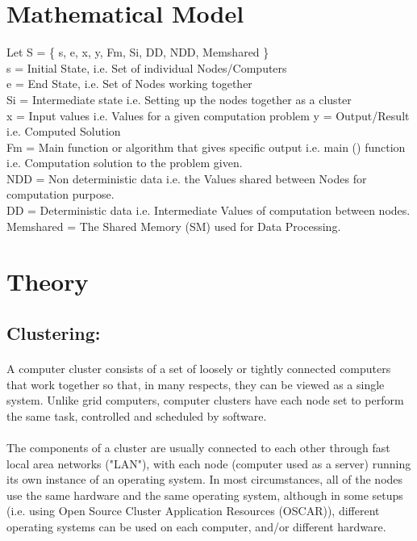 \documentclass[a4paper,12pt]{article}
\begin{document}
\section{Mathematical Model}
	Let S = \{ s, e, x, y, Fm, Si, DD, NDD, Memshared \} \\
	s = Initial State, i.e. Set of individual Nodes/Computers \\  
	e = End State, i.e. Set of Nodes working together \\	 
	Si = Intermediate state i.e. Setting up the nodes together as a cluster  \\
	x = Input values i.e. Values for a given computation problem y = Output/Result i.e. Computed Solution \\	 
	Fm = Main function or algorithm that gives specific output i.e. main () function i.e.  	Computation solution to the problem given. \\
	NDD = Non deterministic data i.e. the Values shared between Nodes for computation  	purpose. \\
	DD = Deterministic data i.e. Intermediate Values of computation between nodes.\\
	 Memshared = The Shared Memory (SM) used for Data Processing. \\
	
	
	
\section{Theory}
\subsection{Clustering:} 
\paragraph{} A computer cluster consists of a set of loosely or tightly connected computers that work together so that, in many respects, they can be viewed as a single system. Unlike grid computers, computer clusters have each node set to perform the same task, controlled and scheduled by software. 

\paragraph{} The components of a cluster are usually connected to each other through fast local area networks ("LAN"), with each node (computer used as a server) running its own instance of an operating system. In most circumstances, all of the nodes use the same hardware and the same operating system, although in some setups (i.e. using Open Source Cluster Application Resources (OSCAR)), different operating systems can be used on each computer, and/or different hardware. \\
\end{document}
